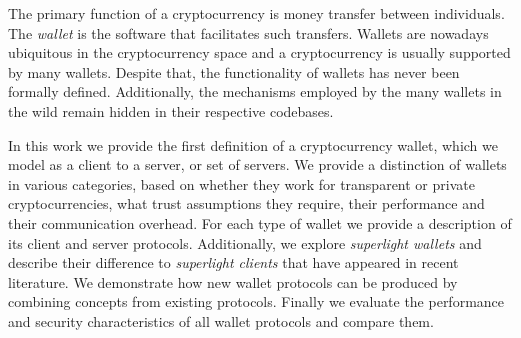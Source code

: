 The primary function of a cryptocurrency is money transfer between individuals. The \emph{wallet} is the software that facilitates such transfers. Wallets are nowadays ubiquitous in the cryptocurrency space and a cryptocurrency is usually supported by many wallets. Despite that, the functionality of wallets has never been formally defined. Additionally, the mechanisms employed by the many wallets in the wild remain hidden in their respective codebases.

In this work we provide the first definition of a cryptocurrency wallet, which we model as a client to a server, or set of servers. We provide a distinction of wallets in various categories, based on whether they work for transparent or private cryptocurrencies, what trust assumptions they require, their performance and their communication overhead. For each type of wallet we provide a description of its client and server protocols. Additionally, we explore \emph{superlight wallets} and describe their difference to \emph{superlight clients} that have appeared in recent literature. We demonstrate how new wallet protocols can be produced by combining concepts from existing protocols. Finally we evaluate the performance and security characteristics of all wallet protocols and compare them.
